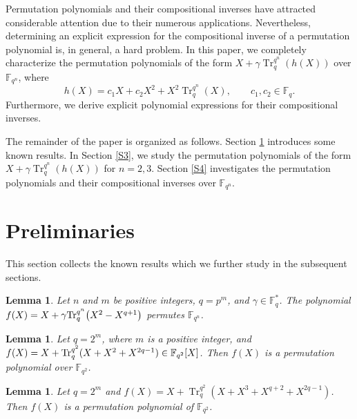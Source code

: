 \documentclass[11pt]{amsart}
\theoremstyle{plain}
\newtheorem{lem}[thm]{Lemma}
\numberwithin{equation}{section}
\theoremstyle{definition}
\newcommand{\F}{\mathbb F}
\def\Tr{{\rm Tr}}
\begin{document}
 
Permutation polynomials and their compositional inverses have attracted considerable attention due to their numerous applications. Nevertheless, determining an explicit expression for the compositional inverse of a permutation polynomial is, in general, a hard problem. In this paper, we completely characterize the permutation polynomials of the form
\(
X+\gamma\operatorname{Tr}_{q}^{q^n}(h(X))
\)
over $\mathbb{F}_{q^n}$, where
\[
h(X)=c_1X+c_2X^2+X^2\operatorname{Tr}_{q}^{q^n}(X),
\qquad c_1,c_2\in\mathbb{F}_q.
\]
Furthermore, we derive explicit polynomial expressions for their compositional inverses.

The remainder of the paper is organized as follows. Section \ref{S2} introduces some known results. In Section \ref{S3}, we study the permutation polynomials of the form $X+\gamma\operatorname{Tr}_{q}^{q^n}(h(X))$ for $n=2, 3.$ Section \ref{S4} investigates the permutation polynomials and their compositional inverses over $\F_{q^n}.$

\section{Preliminaries}\label{S2}
This section collects the known results which we further study in the subsequent sections.
\begin{lem}\label{L21}\cite[Theorem 10]{ZHZ}
Let $n$ and $m$ be positive integers, $q=p^m$, and
$\gamma\in\F_q^{*}$. The polynomial
\(
f(X)=X+\gamma\Tr_{q}^{q^n}\!\left(X^2-X^{q+1}\right)
\)
permutes $\F_{q^n}$.
\end{lem}
\begin{lem}\label{L22}\cite[Theorem 4.1]{JYLQ}
Let $q=2^m$, where $m$ is a positive integer, and $f(X)=X+ \Tr_{q}^{q^2}(X+X^2+X^{2q-1}) \in \F_{q^2}[X]$. Then $f(X)$ is a permutation polynomial over $\F_{q^2}$. 
\end{lem}
\begin{lem}\label{L23}\cite[Theorem 4.2]{JYLQ}
Let $q = 2^m$ and $f(X)=X+\operatorname{Tr}_{q}^{q^2}\left(X+X^3+X^{q+2}+X^{2q-1}\right)$. Then $f(X)$ is a permutation polynomial of $\mathbb{F}_{q^2}$.
\end{lem}
\end{document}
